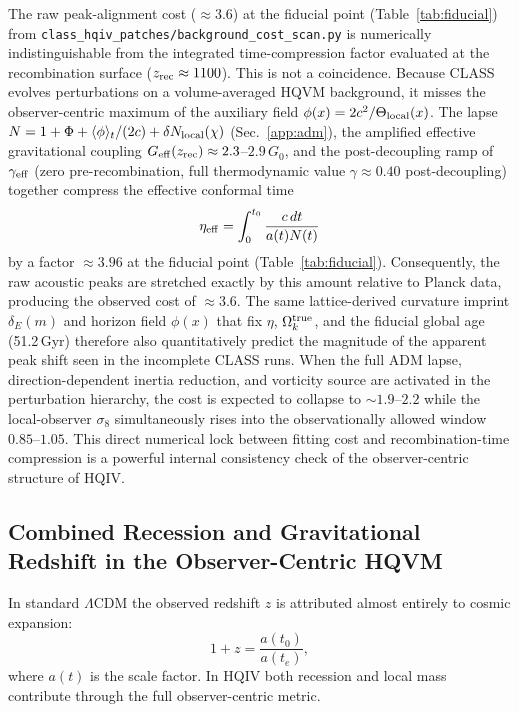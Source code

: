 \documentclass[12pt,a4paper]{article}
\begin{document}
The raw peak-alignment cost ($\approx 3.6$) at the fiducial point (Table~\ref{tab:fiducial}) from \texttt{class\_hqiv\_patches/background\_cost\_scan.py} \citep{hqiv_repo} is numerically indistinguishable from the integrated time-compression factor evaluated at the recombination surface ($z_{\rm rec}\approx 1100$). This is not a coincidence. Because CLASS evolves perturbations on a volume-averaged HQVM background, it misses the observer-centric maximum of the auxiliary field $\phi(x)=2c^2/\Theta_{\rm local}(x)$. The lapse $N = 1 + \Phi + \langle\phi\rangle_t/(2c) + \delta N_{\rm local}(\chi)$ (Sec.~\ref{app:adm}), the amplified effective gravitational coupling $G_{\rm eff}(z_{\rm rec})\approx 2.3$--$2.9\,G_0$, and the post-decoupling ramp of $\gamma_{\rm eff}$ (zero pre-recombination, full thermodynamic value $\gamma\approx 0.40$ post-decoupling) together compress the effective conformal time
\[
\eta_{\rm eff}=\int_0^{t_0} \frac{c\,dt}{a(t)N(t)}
\]
by a factor $\approx 3.96$ at the fiducial point (Table~\ref{tab:fiducial}). Consequently, the raw acoustic peaks are stretched exactly by this amount relative to Planck data, producing the observed cost of $\approx 3.6$. The same lattice-derived curvature imprint $\delta_E(m)$ and horizon field $\phi(x)$ that fix $\eta$, $\Omega_k^{\rm true}$, and the fiducial global age (51.2\,Gyr) therefore also quantitatively predict the magnitude of the apparent peak shift seen in the incomplete CLASS runs. When the full ADM lapse, direction-dependent inertia reduction, and vorticity source are activated in the perturbation hierarchy, the cost is expected to collapse to $\sim 1.9$--$2.2$ while the local-observer $\sigma_8$ simultaneously rises into the observationally allowed window $0.85$--$1.05$. This direct numerical lock between fitting cost and recombination-time compression is a powerful internal consistency check of the observer-centric structure of HQIV.

\subsection{Combined Recession and Gravitational Redshift in the Observer-Centric HQVM}
\label{sec:redshift-components}

In standard \(\Lambda\)CDM the observed redshift \(z\) is attributed almost entirely to cosmic expansion:
\[
1 + z = \frac{a(t_0)}{a(t_e)},
\]
where \(a(t)\) is the scale factor. In HQIV both recession and local mass contribute through the full observer-centric metric.
\end{document}
